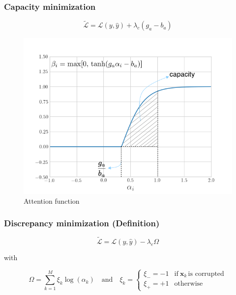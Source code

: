 \documentclass[10pt]{beamer}
\begin{document}
\begin{frame}
\frametitle{Capacity minimization}
\begin{equation}
\tilde{\mathcal{L}} = \mathcal{L}(y,\hat{y}) + \lambda_c(g_a-b_a)
\end{equation}
\begin{figure}
\centering
\includegraphics[scale=0.3]{figs/tanh-annotated}
\caption{Attention function}
\label{fig:attention-function}
\end{figure}
\end{frame}

\begin{frame}
\frametitle{Discrepancy minimization (Definition)}
\begin{equation}
\tilde{\mathcal{L}} = \mathcal{L}(y,\hat{y}) - \lambda_e \Omega
\end{equation}
\begin{center}
with\end{center}
 \begin{equation}
 \Omega = \sum_{k=1}^M \xi_k \log(\alpha_k) \quad \text{and} \quad \xi_k = \begin{cases}
      \xi_- = -1 & \text{if}\ \mathbf{x}_k\, \text{is corrupted} \\
      \xi_+ = +1 & \text{otherwise}
    \end{cases}
\end{equation}
\end{frame}
\end{document}
